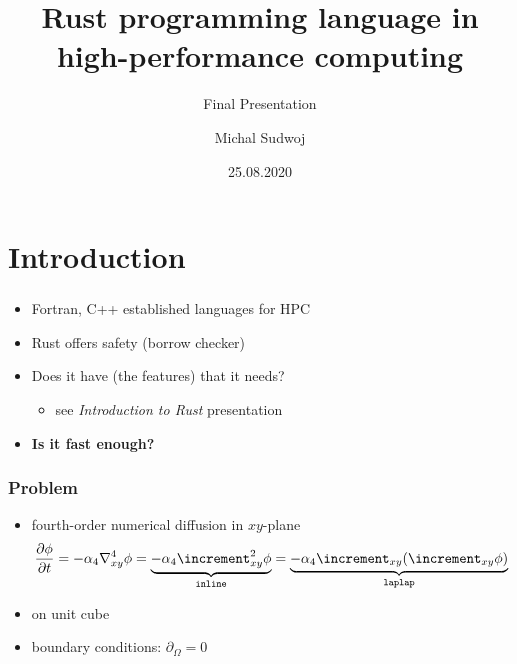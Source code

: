 \documentclass[aspectratio=43, t]{beamer}
\author{Michal Sudwoj}
\title{Rust programming language in high-performance computing}
\subtitle{Final Presentation}
\date{25.08.2020}
\renewcommand{\laplacian}{\increment}
\begin{document}
\renewcommand{\fcolorbox}[4][]{#4}

\begin{frame}[plain, c]
	\titlepage
\end{frame}

\section*{Introduction}
\begin{frame}
	\frametitle{\secname}
	\begin{itemize}
		\item Fortran, C++ established languages for HPC
		\item Rust offers safety (borrow checker)
		\item Does it have (the features) that it needs?
			\begin{itemize}
				\item see \emph{Introduction to Rust} presentation
			\end{itemize}
		\item \textbf{Is it fast enough?}
	\end{itemize}
\end{frame}

\begin{frame}
	\frametitle{Problem}
	\begin{itemize}
		\item fourth-order numerical diffusion in $xy$-plane
			\[ \pdv{\phi}{t} = -\alpha_{4} \nabla^{4}_{xy} \phi = \underbrace{-\alpha_{4} \laplacian^{2}_{xy} \phi}_{\texttt{inline}} = \underbrace{-\alpha_{4} \laplacian_{xy} (\laplacian_{xy} \phi)}_{\texttt{laplap}} \]
		\item on unit cube
		\item boundary conditions: \( \partial_{\Omega} = 0 \)
	\end{itemize}
\end{frame}
\end{document}
